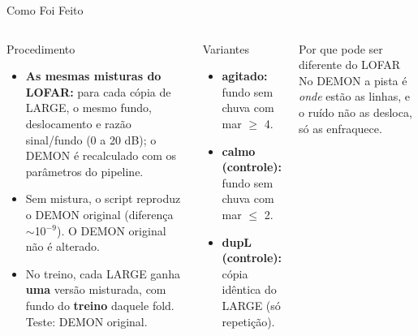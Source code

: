 \documentclass[aspectratio=169]{beamer}
\begin{document}
\begin{frame}{Como Foi Feito}
    \footnotesize
    \begin{columns}[t]
        \begin{block}{\small Procedimento}
            \scriptsize
            \begin{itemize}
                \setlength{\itemsep}{2pt}
                \item \textbf{As mesmas misturas do LOFAR:} para cada cópia de LARGE, o mesmo fundo, deslocamento e razão sinal/fundo (0 a 20 dB); o DEMON é recalculado com os parâmetros do pipeline.
                \item Sem mistura, o script reproduz o DEMON original (diferença $\sim$10$^{-9}$). O DEMON original não é alterado.
                \item No treino, cada LARGE ganha \textbf{uma} versão misturada, com fundo do \textbf{treino} daquele fold. Teste: DEMON original.
            \end{itemize}
        \end{block}
        \begin{block}{\small Variantes}
            \scriptsize
            \begin{itemize}
                \setlength{\itemsep}{2pt}
                \item \textbf{agitado:} fundo sem chuva com mar $\geq$ 4.
                \item \textbf{calmo (controle):} fundo sem chuva com mar $\leq$ 2.
                \item \textbf{dupL (controle):} cópia idêntica do LARGE (só repetição).
            \end{itemize}
        \end{block}
        \begin{alertblock}{\small Por que pode ser diferente do LOFAR}
            \scriptsize
            No DEMON a pista é \emph{onde} estão as linhas, e o ruído não as desloca, só as enfraquece.
        \end{alertblock}
    \end{columns}
\end{frame}
\end{document}
